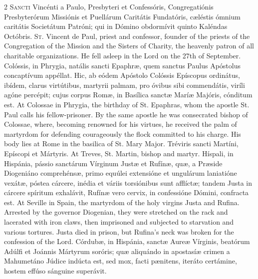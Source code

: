 \begin{paracol}{2}
\lettrine[lines=2]{S}{ancti} Vincénti a 
 Paulo, Presbyteri et Confessóris, Congregatiónis Presbyterórum Missiónis et 
 Puellárum Caritátis Fundatóris, cæléstis ómnium caritátis Societátum Patróni; 
 qui in Dómino obdormívit quinto Kaléndas Octóbris.
\switchcolumn
{}
\lettrine[lines=2]{S}{t.} Vincent de Paul, priest and 
 confessor, founder of the priests of the Congregation of the Mission and the 
 Sisters of Charity, the heavenly patron of all charitable organizations. 
 He fell asleep in the Lord on the 27th of September.
\switchcolumn*
{}
Colóssis, in Phrygia, 
 natális sancti Epaphræ, quem sanctus Paulus Apóstolus concaptívum appéllat. 
 Hic, ab eódem Apóstolo Colóssis Epíscopus ordinátus, ibídem, clarus 
 virtútibus, martyrii palmam, pro óvibus sibi commendátis, viríli agóne 
 percépit; cujus corpus Romæ, in Basílica sanctæ Maríæ Majóris, cónditum est.
\switchcolumn
{}
At Colossae in Phrygia, the birthday 
 of St. Epaphras, whom the apostle St. Paul calls his fellow-prisoner. 
 By the same apostle he was consecrated bishop of Colossae, where, becoming 
 renowned for his virtues, he received the palm of martyrdom for defending 
 courageously the flock committed to his charge. His body lies at Rome 
 in the basilica of St. Mary Major.
\switchcolumn*
{}
Tréviris sancti 
 Martíni, Epíscopi et Mártyris.
\switchcolumn
{}
At Treves, St. Martin, bishop and 
 martyr.
\switchcolumn*
{}
Híspali, in Hispánia, 
 pássio sanctárum Vírginum Justæ et Rufínæ, quæ, a Præside Diogeniáno 
 comprehénsæ, primo equúlei extensióne et ungulárum laniatióne vexátæ, póstea cárcere, inédia et váriis torsiónibus sunt afflíctæ; tandem Justa in cárcere 
 spíritum exhalávit, Rufínæ vero cervix, in confessióne Dómini, confracta 
 est.
\switchcolumn
{}
At Seville in Spain, the martyrdom 
 of the holy virgins Justa and Rufina. Arrested by the governor 
 Diogenian, they were stretched on the rack and lacerated with iron claws, 
 then imprisoned and subjected to starvation and various tortures. 
 Justa died in prison, but Rufina's neck was broken for the confession of the 
 Lord.
\switchcolumn*
{}
Córdubæ, in Hispánia, 
 sanctæ Aureæ Vírginis, beatórum Adúlfi et Joánnis Mártyrum soróris; quæ 
 aliquándo in apostasíæ crimen a Mahumetáno Júdice indúcta est, sed mox, 
 facti pænitens, iteráto certámine, hostem effúso sánguine superávit.
\switchcolumn

\end{paracol}
